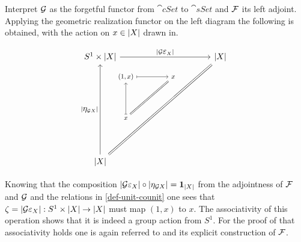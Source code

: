 \documentclass[../../main.tex]{subfiles}
\begin{document}
    Interpret $\functor{G}$ as the forgetful functor from $\cat{cSet}$ to $\cat{sSet}$ and $\functor{F}$ its left adjoint. Applying the geometric realization functor on the left diagram the following is obtained, with the action on $x \in \geom[X]$ drawn in.

    \begin{figure}[H]
        \[ 
            \stackinset{l}{10ex}{b}{13ex}{%
                \scalebox{.8}
                {%
                    \begin{tikzcd}[row sep=11ex, column sep = 11ex, ampersand replacement=\&]
                        (1,x)\arrow[mapsto]{r} \& x \arrow[dl,equal] \\
                        x \arrow[u,mapsto]
                    \end{tikzcd}
                }
            }{%
                \begin{tikzcd}[row sep = 25ex, column sep = 25ex, ampersand replacement=\&]
                    S^1 \times \geom[X] \arrow[r,"|\functor{G} \mathlarger{\varepsilon}_X|"] \& \geom[X] \\
                    \geom[X] \arrow[u,"|\mathlarger{\eta}_{\functor{G}X}|"] \arrow[ur, equal]
                \end{tikzcd}
            }
        \]
    \end{figure}

    Knowing that the composition $|\functor{G} \mathlarger{\varepsilon}_X| \circ |\mathlarger{\eta}_{\functor{G}X}| = \idarrow[|X|]$ from the adjointness of $\functor{F}$ and $\functor{G}$ and the relations in \ref{def-unit-counit} one sees that $\zeta = |\functor{G} \mathlarger{\varepsilon}_X|: S^1 \times \geom[X] \to \geom[X]$ must map $(1, x)$ to $x$. The associativity of this operation shows that it is indeed a group action from $S^1$. For the proof of that associativity holds one is again referred to \cite{loday-cyclic} and its explicit construction of $\functor{F}$.
\end{document}
